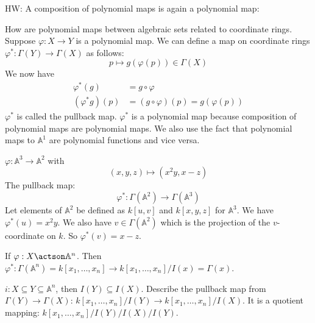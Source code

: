 \documentclass{report}
\begin{document}
HW: A composition of polynomial maps is again a polynomial map:
    \begin{center}
    \end{center}

How are polynomial maps between algebraic sets related to coordinate rings. Suppose $\varphi: X \rightarrow Y$ is a polynomial map. We can define a map on coordinate rings $\varphi^{*}: \Gamma(Y) \rightarrow \Gamma(X)$ as follows:
    \begin{equation*}
        p \mapsto g(\varphi(p)) \in \Gamma(X)
    \end{equation*}
We now have
    \begin{align*}
        \varphi^{*}(g) &= g \circ \varphi \\
        (\varphi^{*}g)(p) &= (g \circ \varphi)(p) = g(\varphi(p))
    \end{align*}
$\varphi^{*}$ is called the pullback map. $\varphi^{*}$ is a polynomial map because composition of polynomial maps are polynomial maps. We also use the fact that polynomial maps to $\mathbb{A}^{1}$ are polynomial functions and vice versa.

\begin{examples}
    \begin{example}
        $\varphi: \mathbb{A}^{3} \rightarrow \mathbb{A}^{2}$ with
            \begin{equation*}
                (x, y, z) \mapsto (x^{2}y, x - z) 
            \end{equation*}
        The pullback map:
            \begin{equation*}
                \varphi^{*} : \Gamma(\mathbb{A}^{2}) \rightarrow \Gamma(\mathbb{A}^{3})
            \end{equation*}
        Let elements of $\mathbb{A}^{2}$ be defined as $k[u, v]$ and $k[x, y, z]$ for $\mathbb{A}^{3}$. We have $\varphi^{*}(u) = x^{2}y$. We also have $v \in \Gamma(\mathbb{A}^{2})$ which is the projection of the $v$-coordinate on $k$. So $\varphi^{*}(v) = x - z$.
    \end{example}
    \begin{example}
        If $\varphi: X \actson \mathbb{A}^{n}$. Then $\varphi^{*}: \Gamma(\mathbb{A}^{n}) = k[x_{1}, \ldots , x_{n}] \rightarrow k[x_{1}, \ldots , x_{n}]/I(x) = \Gamma(x)$.
    \end{example}
    \begin{example}
        $i: X \subseteq Y \subseteq \mathbb{A}^{n}$, then $I(Y) \subseteq I(X)$. Describe the pullback map from $\Gamma(Y) \rightarrow \Gamma(X)$: $k[x_{1}, \ldots , x_{n}]/I(Y) \rightarrow k[x_{1}, \ldots , x_{n}]/I(X)$. It is a quotient mapping: $k[x_{1}, \ldots , x_{n}]/I(Y)/I(X)/I(Y)$.
    \end{example}
\end{examples}
\end{document}
